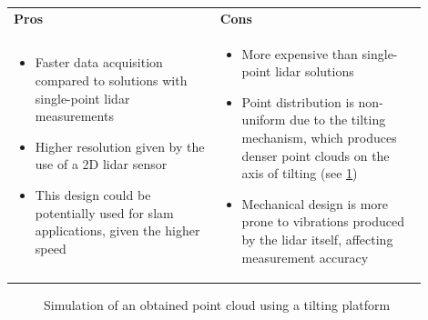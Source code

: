 \begin{tabular}{p{0.45\linewidth} p{0.45\linewidth}}
\textbf{Pros} & \textbf{Cons} \\
\begin{itemize}[label=\textcolor{green!60!black}{\textbf{+}}]
    \item Faster data acquisition compared to solutions with single-point \gls{lidar} measurements
    \item Higher resolution given by the use of a 2D \gls{lidar} sensor
    \item This design could be potentially used for \gls{slam} applications, given the higher speed
\end{itemize}
&
\begin{itemize}[label=\textcolor{red!70!black}{\textbf{--}}]
    \item More expensive than single-point \gls{lidar} solutions
    \item Point distribution is non-uniform due to the tilting mechanism, which produces denser point clouds on the axis of tilting (see \cref{fig:tilt_pointCloud})
    \item Mechanical design is more prone to vibrations produced by the \gls{lidar} itself, affecting measurement accuracy
\end{itemize}
\end{tabular}
\begin{figure}[H]
    \centering
    
    \caption{Simulation of an obtained point cloud using a tilting platform}
    \label{fig:tilt_pointCloud}
\end{figure}
